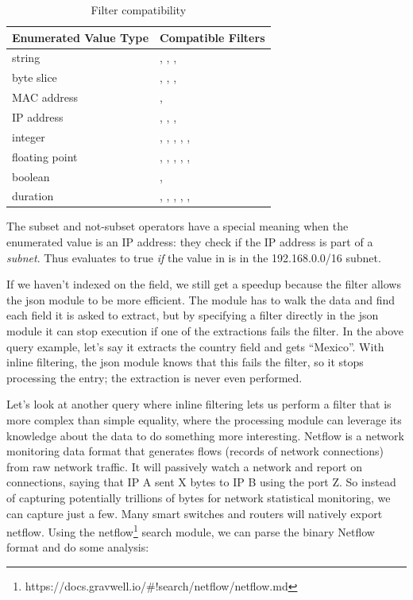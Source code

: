 \begin{table}[H]
\begin{tabular}{ll}
\textbf{Enumerated Value Type} & \textbf{Compatible Filters} \\
\hline
string & \code{==}, \code{!=}, \code{\textasciitilde}, \code{!\textasciitilde} \\
byte slice & \code{==}, \code{!=}, \code{\textasciitilde}, \code{!\textasciitilde} \\
MAC address & \code{==}, \code{!=} \\
IP address & \code{==}, \code{!=}, \code{\textasciitilde}, \code{!\textasciitilde} \\
integer & \code{==}, \code{!=}, \code{<}, \code{>}, \code{<=}, \code{>=} \\
floating point & \code{==}, \code{!=}, \code{<}, \code{>}, \code{<=}, \code{>=} \\
boolean & \code{==}, \code{!=} \\
duration & \code{==}, \code{!=}, \code{<}, \code{>}, \code{<=}, \code{>=} \\
\end{tabular}
\caption{Filter compatibility}
\label{table:filter-compatibility}
\end{table}

The subset and not-subset operators have a special meaning when the enumerated value is an IP address: they check if the IP address is part of a \emph{subnet}. Thus  evaluates to true \emph{if} the value in  is in the 192.168.0.0/16 subnet.

If we haven't indexed on the  field, we still get a speedup
because the filter allows the json module to be more efficient. The
 module has to walk the data and find each field it is asked to
extract, but by specifying a filter directly in the json module it can
stop execution if one of the extractions fails the filter. In the above
query example, let's say it extracts the country field and gets ``Mexico''.
With inline filtering, the json module knows that this fails the
filter, so it stops processing the entry; the  extraction is
never even performed.

Let's look at another query where inline
filtering lets us perform a filter that is more complex than simple
equality, where the processing module can leverage its knowledge about
the data to do something more interesting. Netflow is a network monitoring data format that generates flows
(records of network connections) from raw network traffic. It will passively watch a network and report on connections, saying that
IP A sent X bytes to IP B using the port Z. So instead of capturing
potentially trillions of bytes for network statistical monitoring, we can
capture just a few. Many smart switches and routers will natively
export netflow.
Using the netflow\footnote{https://docs.gravwell.io/\#!search/netflow/netflow.md} search
module, we can parse the binary Netflow format and do some analysis:

